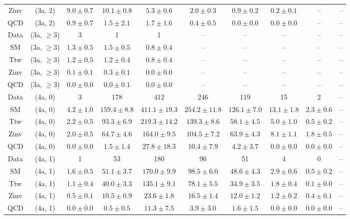 \begin{table}[h!]
{\begin{tabular}{cccccccccc}
	Zinv & (3a, 2) & $9.0\pm 0.7$ & $10.1\pm 0.8$ & $5.3\pm 0.6$ & $2.0\pm 0.3$ & $0.9\pm 0.2$ & $0.2\pm 0.1$ & -- & -- \\[0.5ex] 
	QCD & (3a, 2) & $0.9\pm 0.7$ & $1.5\pm 2.1$ & $1.7\pm 1.6$ & $0.4\pm 0.5$ & $0.0\pm 0.0$ & $0.0\pm 0.0$ & -- & -- \\[0.5ex] 
	Data & (3a, $\ge3$) & 3 & 1 & 1 & -- & -- & -- & -- & -- \\[0.5ex] 
	SM & (3a, $\ge3$) & $1.3\pm 0.5$ & $1.5\pm 0.5$ & $0.8\pm 0.4$ & -- & -- & -- & -- & -- \\[0.5ex] 
	Ttw & (3a, $\ge3$) & $1.2\pm 0.5$ & $1.2\pm 0.4$ & $0.8\pm 0.4$ & -- & -- & -- & -- & -- \\[0.5ex] 
	Zinv & (3a, $\ge3$) & $0.1\pm 0.1$ & $0.3\pm 0.1$ & $0.0\pm 0.0$ & -- & -- & -- & -- & -- \\[0.5ex] 
	QCD & (3a, $\ge3$) & $0.0\pm 0.0$ & $0.0\pm 0.1$ & $0.0\pm 0.0$ & -- & -- & -- & -- & -- \\[0.5ex] 
	Data & (4a, 0) & 3 & 178 & 412 & 246 & 119 & 15 & 2 & -- \\[0.5ex] 
	SM & (4a, 0) & $4.2\pm 1.0$ & $159.4\pm 8.8$ & $411.1\pm 19.3$ & $254.2\pm 11.8$ & $126.1\pm 7.0$ & $13.1\pm 1.8$ & $2.3\pm 0.6$ & -- \\[0.5ex] 
	Ttw & (4a, 0) & $2.2\pm 0.5$ & $93.3\pm 6.9$ & $219.3\pm 14.2$ & $139.3\pm 8.6$ & $58.1\pm 4.5$ & $5.0\pm 1.0$ & $0.5\pm 0.2$ & -- \\[0.5ex] 
	Zinv & (4a, 0) & $2.0\pm 0.5$ & $64.7\pm 4.6$ & $164.0\pm 9.5$ & $104.5\pm 7.2$ & $63.9\pm 4.3$ & $8.1\pm 1.1$ & $1.8\pm 0.5$ & -- \\[0.5ex] 
	QCD & (4a, 0) & $0.0\pm 0.0$ & $1.5\pm 1.4$ & $27.8\pm 18.3$ & $10.4\pm 7.9$ & $4.2\pm 3.7$ & $0.0\pm 0.0$ & $0.0\pm 0.0$ & -- \\[0.5ex] 
	Data & (4a, 1) & 1 & 53 & 180 & 96 & 51 & 4 & 0 & -- \\[0.5ex] 
	SM & (4a, 1) & $1.6\pm 0.5$ & $51.1\pm 3.7$ & $170.0\pm 9.9$ & $98.5\pm 6.0$ & $48.6\pm 4.3$ & $2.9\pm 0.6$ & $0.5\pm 0.2$ & -- \\[0.5ex] 
	Ttw & (4a, 1) & $1.1\pm 0.4$ & $40.0\pm 3.3$ & $135.1\pm 9.1$ & $78.1\pm 5.5$ & $34.9\pm 3.5$ & $1.8\pm 0.4$ & $0.1\pm 0.0$ & -- \\[0.5ex] 
	Zinv & (4a, 1) & $0.5\pm 0.1$ & $10.5\pm 0.9$ & $23.6\pm 1.8$ & $16.5\pm 1.4$ & $12.0\pm 1.2$ & $1.2\pm 0.2$ & $0.4\pm 0.1$ & -- \\[0.5ex] 
	QCD & (4a, 1) & $0.0\pm 0.0$ & $0.5\pm 0.5$ & $11.3\pm 7.5$ & $3.9\pm 3.0$ & $1.6\pm 1.5$ & $0.0\pm 0.0$ & $0.0\pm 0.0$ & -- \\[0.5ex] 

\end{tabular}}
\end{table}
